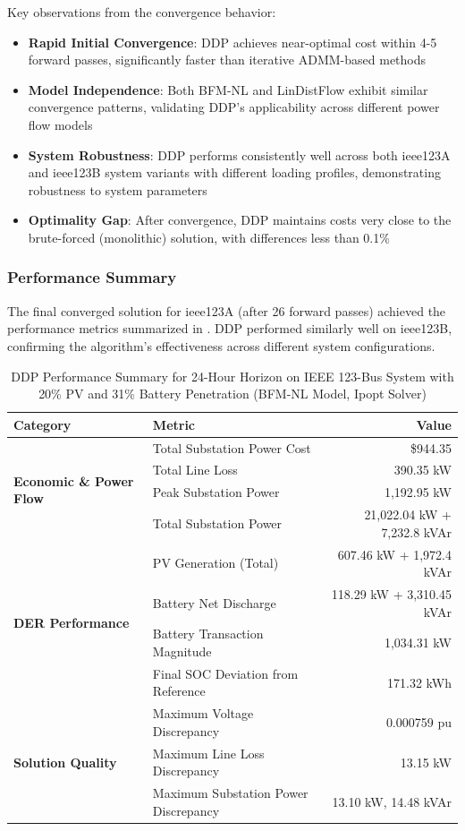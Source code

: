 Key observations from the convergence behavior:
\begin{itemize}
    \item \textbf{Rapid Initial Convergence}: DDP achieves near-optimal cost within 4-5 forward passes, significantly faster than iterative ADMM-based methods
    \item \textbf{Model Independence}: Both BFM-NL and LinDistFlow exhibit similar convergence patterns, validating DDP's applicability across different power flow models
    \item \textbf{System Robustness}: DDP performs consistently well across both ieee123A and ieee123B system variants with different loading profiles, demonstrating robustness to system parameters
    \item \textbf{Optimality Gap}: After convergence, DDP maintains costs very close to the brute-forced (monolithic) solution, with differences less than 0.1\%
\end{itemize}

\subsubsection{Performance Summary}

The final converged solution for ieee123A (after 26 forward passes) achieved the performance metrics summarized in . DDP performed similarly well on ieee123B, confirming the algorithm's effectiveness across different system configurations.

\begin{table}[h]
\centering
\caption{DDP Performance Summary for 24-Hour Horizon on IEEE 123-Bus System with 20\% PV and 31\% Battery Penetration (BFM-NL Model, Ipopt Solver)}
\label{tab:ddp-results}
\begin{tabular}{@{}llr@{}}
\toprule
\textbf{Category} & \textbf{Metric} & \textbf{Value} \\ 
\midrule
\multirow{4}{*}{\textbf{Economic \& Power Flow}} 
    & Total Substation Power Cost & \$944.35 \\
    & Total Line Loss & 390.35 kW \\
    & Peak Substation Power & 1,192.95 kW \\
    & Total Substation Power & 21,022.04 kW + 7,232.8 kVAr \\
\midrule
\multirow{4}{*}{\textbf{DER Performance}} 
    & PV Generation (Total) & 607.46 kW + 1,972.4 kVAr \\
    & Battery Net Discharge & 118.29 kW + 3,310.45 kVAr \\
    & Battery Transaction Magnitude & 1,034.31 kW \\
    & Final SOC Deviation from Reference & 171.32 kWh \\
\midrule
\multirow{3}{*}{\textbf{Solution Quality}} 
    & Maximum Voltage Discrepancy & 0.000759 pu \\
    & Maximum Line Loss Discrepancy & 13.15 kW \\
    & Maximum Substation Power Discrepancy & 13.10 kW, 14.48 kVAr \\
\bottomrule
\end{tabular}
\end{table}

